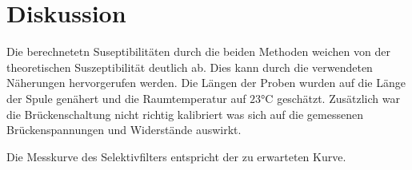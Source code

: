 \section{Diskussion}
\label{sec:Diskussion}
Die berechnetetn Suseptibilitäten durch die beiden Methoden weichen von der
theoretischen Suszeptibilität deutlich ab. Dies kann durch die verwendeten Näherungen hervorgerufen werden.
Die Längen der Proben wurden auf die Länge der Spule genähert und die Raumtemperatur auf $23$°C geschätzt.
Zusätzlich war die Brückenschaltung nicht richtig kalibriert was sich auf die gemessenen Brückenspannungen
und Widerstände auswirkt.

Die Messkurve des Selektivfilters entspricht der zu erwarteten Kurve.
